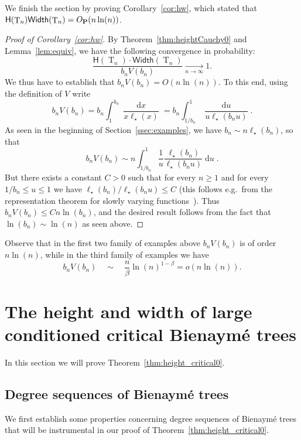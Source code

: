 \documentclass[AHL,Unicode,longabstracts,published]{cedram}
\newcommand{\height}{\mathsf{H}}
\newcommand{\p}{\mathbf{P}}
\newcommand{\Width}{\mathsf{Width}}
\DeclareMathOperator{\rtree}{T}
\DeclareMathOperator{\dxseq}{d\mathit{x}}
\DeclareMathOperator{\duseq}{d\mathit{u}}
\begin{document}
We finish the section by proving Corollary~\ref{cor:hw}, which stated that $\height(\rtree_{n})\Width(\rtree_{n}) \linebreak= O_{\p}({n \ln(n)})$.
\begin{proof}[Proof of Corollary~\ref{cor:hw}]
By Theorem~\ref{thm:heightCauchy0} and Lemma~\ref{lem:equiv}, we have the following convergence in probability:
\[
\frac{\height(\rtree_{n}) \cdot \Width(\rtree_{n}) }{ b_{n} V(b_{n})}  \xrightarrow[n\to\infty]{}  1.
\]
We thus have to establish that $ b_{n} V(b_{n}) = O(n \ln(n))$. To this end, using the definition of $V$ write
\[
b_{n} V(b_{n})= b_{n} \int_{1}^{ b_{n} } \frac{\dxseq}{x \ell_{\star}(x)}= b_{n} \int_{1/ b_{n} }^{1} \frac{\duseq}{u \ell_{\star}(b_{n} u)}.
\]
As seen in the beginning of Section~\ref{ssec:examples}, we have $ b_{n} \sim n \ell_{\star}(b_{n})$, so that
\[
b_{n} V(b_{n})  \sim  n \int_{1/ b_{n} }^{1} \frac{1}{u} \frac{\ell_{\star}(b_{n})}{ \ell_{\star}(b_{n} u)} \duseq.
\]
But there exists a constant $C>0$ such that for every $ n \geq 1$ and for every $1/ b_{n} \leq u \leq 1$ we have $\ell_{\star}(b_{n})/\ell_{\star}(b_{n} u) \leq C$ (this follows e.g.~from the representation theorem for slowly varying functions~\cite[Theorem~1.3.1]{BGT89}). Thus $ b_{n} V(b_{n}) \leq C n \ln(b_{n})$, and the desired result follows from the fact that $\ln(b_{n}) \sim \ln(n)$ as seen above.
\end{proof}

Observe that in the first two family of examples above $b_{n} V(b_{n})$ is of order $n \ln(n)$, while in the third family of examples we have
\[
b_{n} V(b_{n}) \quad \sim \quad \frac{n}{\beta} \ln(n)^{1-\beta} = o(n \ln(n)).
\]

\section{The height {and width} of large conditioned critical Bienaymé trees}\label{sec:height_critical}
In this section we will prove Theorem~\ref{thm:height_critical0}.


\subsection{Degree sequences of Bienaymé trees}\label{ssec:deg_seq_bien}
We first establish some properties concerning degree sequences of Bienaymé trees {that will be instrumental in our proof of Theorem~\ref{thm:height_critical0}.}
\end{document}
